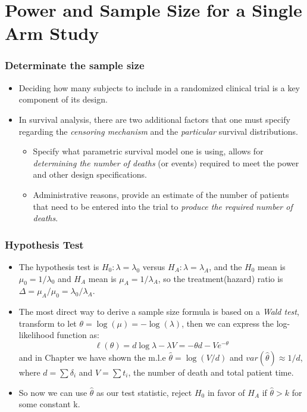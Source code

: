 \documentclass{beamer}
\newcommand{\empr}[1]{{\emph{\color{red}#1}}}
\begin{document}
\section{Power and Sample Size for a Single Arm Study}
\begin{frame}
\frametitle{Determinate the sample size}
\begin{itemize}
\item Deciding how many subjects to include in a randomized clinical trial is a key component of its design.
\item   In survival analysis, there are two additional factors that one must specify regarding the \empr{censoring mechanism} and the \empr{particular} survival distributions.
\begin{itemize}
\item Specify what parametric survival model one is using, allows for \empr{determining the number of deaths} (or events) required to meet the power and other design specifications.
\item  Administrative reasons, provide an estimate of the number of patients that need to be entered into the trial to \empr{produce the required number of deaths}.
\end{itemize}
\end{itemize}
\end{frame}

\pagebreak
\begin{frame}
\frametitle{Hypothesis Test}
\begin{itemize}
\item The hypothesis test is $H_0: \lambda = \lambda_0$ versus $H_A:
\lambda = \lambda_A$, and the $H_0$ mean is $\mu_0 = 1/\lambda_0$ and $H_A$ mean is $\mu_A = 1/\lambda_A$, so the treatment(hazard) ratio is $\Delta = \mu_A/\mu_0 = \lambda_0/\lambda_A$. 
\item The most direct way to derive a sample size formula is based on a \empr{Wald test}, transform to let $\theta = \log(\mu) = -\log(\lambda)$, then we can express the log-likelihood function as: 
\begin{equation}
\ell(\theta) = d\log \lambda - \lambda V = -\theta d - Ve^{-\theta}
\end{equation}
and in Chapter we have shown the m.l.e $\hat{\theta} = \log(V/d)$ and $var(\hat{\theta}) \approx 1/d$, where $d = \sum\delta_i$ and $V = \sum t_i$, the number of death and total patient time.
\item So now we can use $\hat{\theta}$ as our test statistic, reject $H_0$ in favor of $H_A$ if $\hat{\theta} > k$ for some constant k.
\end{itemize}
\end{frame}
\end{document}

